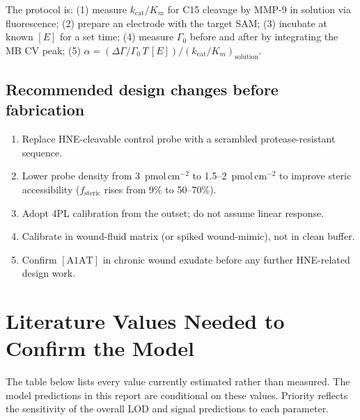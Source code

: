 \documentclass[10pt,a4paper]{article}
\begin{document}
The protocol is: (1) measure $k_\text{cat}/K_m$ for C15 cleavage by MMP-9 in solution via
fluorescence; (2) prepare an electrode with the target SAM; (3) incubate at known $[E]$ for
a set time; (4) measure $\Gamma_0$ before and after by integrating the MB CV peak; (5)
$\alpha = (\Delta\Gamma/\Gamma_0\,T\,[E]) / (k_\text{cat}/K_m)_\text{solution}$.

\subsection{Recommended design changes before fabrication}

\begin{enumerate}[noitemsep]
\item Replace HNE-cleavable control probe with a scrambled protease-resistant sequence.
\item Lower probe density from 3~pmol\,cm$^{-2}$ to 1.5--2~pmol\,cm$^{-2}$ to improve
  steric accessibility ($f_\text{steric}$ rises from 9\% to 50--70\%).
\item Adopt 4PL calibration from the outset; do not assume linear response.
\item Calibrate in wound-fluid matrix (or spiked wound-mimic), not in clean buffer.
\item Confirm $[\text{A1AT}]$ in chronic wound exudate before any further HNE-related design work.
\end{enumerate}

\section{Literature Values Needed to Confirm the Model}
\label{sec:litgaps}

The table below lists every value currently estimated rather than measured. The model
predictions in this report are conditional on these values. Priority reflects the
sensitivity of the overall LOD and signal predictions to each parameter.
\end{document}
